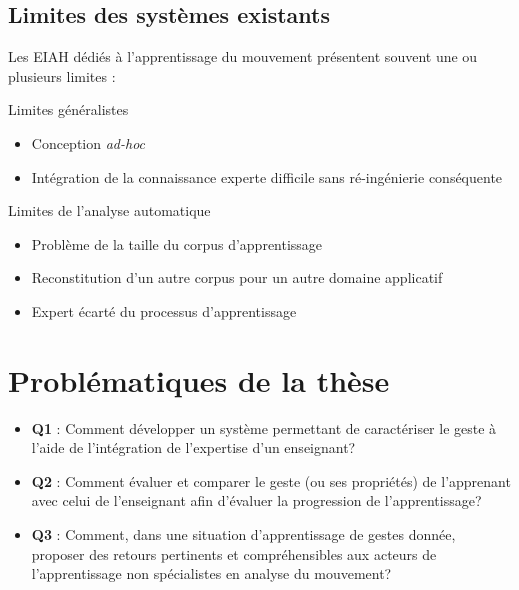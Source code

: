 \documentclass[svgnames]{beamer}
\begin{document}
	\subsection{Limites des systèmes existants}
	\begin{frame}{\subsecname}
		Les EIAH dédiés à l'apprentissage du mouvement présentent souvent une ou plusieurs limites :
		\begin{block}{Limites généralistes}
			\begin{itemize}[label=$\bullet$]
				\item Conception \textit{ad-hoc}
				\item Intégration de la connaissance experte difficile sans ré-ingénierie conséquente
			\end{itemize}
		\end{block}
		
		\begin{block}{Limites de l'analyse automatique}
			\begin{itemize}[label=$\bullet$]
				\item Problème de la taille du corpus d'apprentissage
				\item Reconstitution d'un autre corpus pour un autre domaine applicatif
				\item Expert écarté du processus d'apprentissage
			\end{itemize}
		\end{block}
	\end{frame}
	
	\section{Problématiques de la thèse}
	\begin{frame}{\subsecname}
		\begin{itemize}[label=$-$]
			\item \textbf{Q1} : Comment développer un système permettant de caractériser le geste à l'aide de l'intégration de l'expertise d'un enseignant?
			\item \textbf{Q2} : Comment évaluer et comparer le geste (ou ses propriétés) de l'apprenant avec celui de l'enseignant afin d'évaluer la progression de l'apprentissage?
			\item \textbf{Q3} : Comment, dans une situation d'apprentissage de gestes donnée, proposer des retours pertinents et compréhensibles aux acteurs de l'apprentissage non spécialistes en analyse du mouvement?
		\end{itemize}
	\end{frame}
\end{document}
